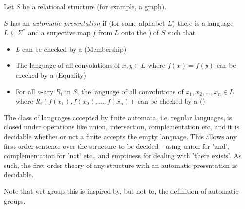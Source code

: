\documentclass[12pt]{article}
\begin{document}
Let $S$ be a relational structure (for example, a graph).

$S$ has an \emph{automatic presentation} if (for some alphabet $\Sigma$) there is a language $L\subseteq \Sigma^*$ and a surjective map $f$ from $L$ onto the ) of $S$ such that
\begin{itemize}
\item $L$ can be checked by a  (Membership)
\item The language of all convolutions of $x,y\in L$ where $f(x)=f(y)$ can be checked by a  (Equality)
\item For all $n$-ary  $R_i$ in $S$, the language of all convolutions of $x_1,x_2,\ldots,x_n\in L$ where $R_i(f(x_1),f(x_2),\ldots,f(x_n))$ can be checked by a  ()
\end{itemize}

The class of languages accepted by finite automata, i.e. regular languages, is closed under operations like union, intersection, complementation etc, and it is decidable whether or not a finite  accepts the empty language.  This allows any first order sentence over the structure to be decided - using union for 'and', complementation for 'not' etc., and emptiness for dealing with 'there exists'.  As such, the first order theory of any structure with an automatic presentation is decidable.

Note that wrt group  this is inspired by, but not  to, the definition of automatic groups.
\end{document}
